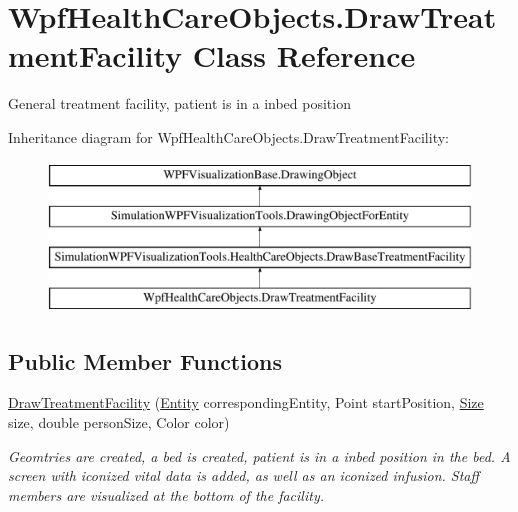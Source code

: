 \hypertarget{class_wpf_health_care_objects_1_1_draw_treatment_facility}{}\section{Wpf\+Health\+Care\+Objects.\+Draw\+Treatment\+Facility Class Reference}
\label{class_wpf_health_care_objects_1_1_draw_treatment_facility}


General treatment facility, patient is in a inbed position  


Inheritance diagram for Wpf\+Health\+Care\+Objects.\+Draw\+Treatment\+Facility\+:\begin{figure}[H]
\begin{center}
\leavevmode
\includegraphics[height=4.000000cm]{class_wpf_health_care_objects_1_1_draw_treatment_facility}
\end{center}
\end{figure}
\subsection*{Public Member Functions}
\begin{DoxyCompactItemize}
\item 
\hyperlink{class_wpf_health_care_objects_1_1_draw_treatment_facility_adaa0d9e036a9d50dd7cbaa4daa80b6c6}{Draw\+Treatment\+Facility} (\hyperlink{class_simulation_core_1_1_h_c_c_m_elements_1_1_entity}{Entity} corresponding\+Entity, Point start\+Position, \hyperlink{class_simulation_w_p_f_visualization_tools_1_1_health_care_objects_1_1_draw_base_treatment_facility_a83f48a13fa5f4f714e22088818f2038a}{Size} size, double person\+Size, Color color)
\begin{DoxyCompactList}\small\item\em Geomtries are created, a bed is created, patient is in a inbed position in the bed. A screen with iconized vital data is added, as well as an iconized infusion. Staff members are visualized at the bottom of the facility. \end{DoxyCompactList}\end{DoxyCompactItemize}
